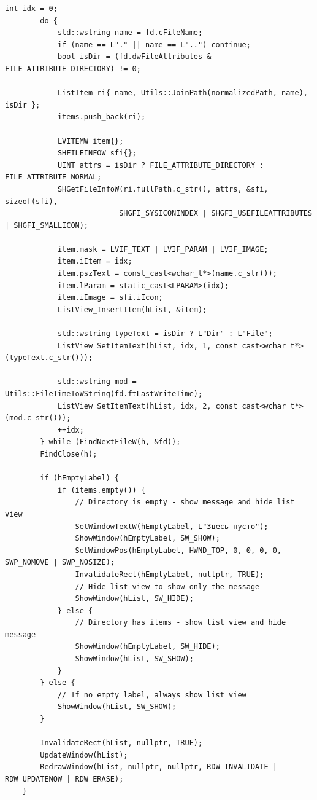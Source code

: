 \begin{lstlisting}[style=CodeListing]
        int idx = 0;
        do {
            std::wstring name = fd.cFileName;
            if (name == L"." || name == L"..") continue;
            bool isDir = (fd.dwFileAttributes & FILE_ATTRIBUTE_DIRECTORY) != 0;

            ListItem ri{ name, Utils::JoinPath(normalizedPath, name), isDir };
            items.push_back(ri);

            LVITEMW item{};
            SHFILEINFOW sfi{};
            UINT attrs = isDir ? FILE_ATTRIBUTE_DIRECTORY : FILE_ATTRIBUTE_NORMAL;
            SHGetFileInfoW(ri.fullPath.c_str(), attrs, &sfi, sizeof(sfi), 
                          SHGFI_SYSICONINDEX | SHGFI_USEFILEATTRIBUTES | SHGFI_SMALLICON);

            item.mask = LVIF_TEXT | LVIF_PARAM | LVIF_IMAGE;
            item.iItem = idx;
            item.pszText = const_cast<wchar_t*>(name.c_str());
            item.lParam = static_cast<LPARAM>(idx);
            item.iImage = sfi.iIcon;
            ListView_InsertItem(hList, &item);

            std::wstring typeText = isDir ? L"Dir" : L"File";
            ListView_SetItemText(hList, idx, 1, const_cast<wchar_t*>(typeText.c_str()));

            std::wstring mod = Utils::FileTimeToWString(fd.ftLastWriteTime);
            ListView_SetItemText(hList, idx, 2, const_cast<wchar_t*>(mod.c_str()));
            ++idx;
        } while (FindNextFileW(h, &fd));
        FindClose(h);
        
        if (hEmptyLabel) {
            if (items.empty()) {
                // Directory is empty - show message and hide list view
                SetWindowTextW(hEmptyLabel, L"Здесь пусто");
                ShowWindow(hEmptyLabel, SW_SHOW);
                SetWindowPos(hEmptyLabel, HWND_TOP, 0, 0, 0, 0, SWP_NOMOVE | SWP_NOSIZE);
                InvalidateRect(hEmptyLabel, nullptr, TRUE);
                // Hide list view to show only the message
                ShowWindow(hList, SW_HIDE);
            } else {
                // Directory has items - show list view and hide message
                ShowWindow(hEmptyLabel, SW_HIDE);
                ShowWindow(hList, SW_SHOW);
            }
        } else {
            // If no empty label, always show list view
            ShowWindow(hList, SW_SHOW);
        }
        
        InvalidateRect(hList, nullptr, TRUE);
        UpdateWindow(hList);
        RedrawWindow(hList, nullptr, nullptr, RDW_INVALIDATE | RDW_UPDATENOW | RDW_ERASE);
    }
    

\end{lstlisting}
